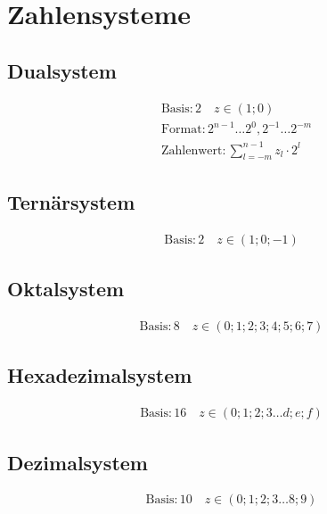 \section{Zahlensysteme}
\begin{multicols}{2}
	\subsection{Dualsystem}
	\begin{align*}
	&\text{Basis}:2\quad z\in\left(1;0\right)\\
	&\text{Format}:2^{n-1} \dots 2^{0},2^{-1} \dots 2^{-m}\\
	&\text{Zahlenwert}:\sum_{l=-m}^{n-1}z_l\cdot2^l
	\end{align*}
	
	\subsection{Ternärsystem}
	\begin{align*}
	\text{Basis}:2\quad z\in\left(1;0;-1\right)
	\end{align*}
	
	\subsection{Oktalsystem}
	\begin{align*}
	\text{Basis}:8\quad z\in\left(0;1;2;3;4;5;6;7\right)
	\end{align*}
	
	\subsection{Hexadezimalsystem}
	\begin{align*}
	\text{Basis}:16\quad z\in\left(0;1;2;3\dots d;e;f\right)
	\end{align*}
	
	\subsection{Dezimalsystem}
	\begin{align*}
	\text{Basis}:10\quad z\in\left(0;1;2;3\dots 8;9\right)
	\end{align*}
\end{multicols}

\newpage
{}

